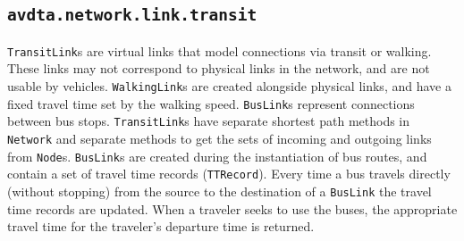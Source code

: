\subsection{\texttt{avdta.network.link.transit}}

\texttt{TransitLink}s are virtual links that model connections via transit or walking. These links may not correspond to physical links in the network, and are not usable by vehicles. \texttt{WalkingLink}s are created alongside physical links, and have a fixed travel time set by the walking speed. \texttt{BusLink}s represent connections between bus stops. \texttt{TransitLink}s have separate shortest path methods in \texttt{Network} and separate methods to get the sets of incoming and outgoing links from \texttt{Node}s. \texttt{BusLink}s are created during the instantiation of bus routes, and contain a set of travel time records (\texttt{TTRecord}). Every time a bus travels directly (without stopping) from the source to the destination of a \texttt{BusLink} the travel time records are updated. When a traveler seeks to use the buses, the appropriate travel time for the traveler's departure time is returned.